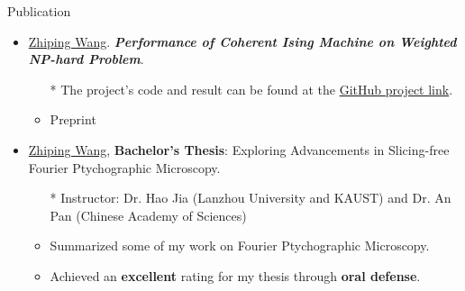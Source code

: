 \documentclass[]{kyvernitis-resume}
\begin{document}
\begin{section}{\Large Publication}
\begin{itemize}
    \item \underline{Zhiping Wang}. \emph{\textbf{Performance of Coherent Ising Machine on Weighted NP-hard Problem}}.
    \begin{itemize}
    \item[*] The project's code and result can be found at the \href{https://github.com/Wang-Zhiping/Exploring-the-Performance-of-Coherent-Ising-Machine-in-weighted-NP-Hard-Problems}{GitHub project link}.
    \item Preprint
    \end{itemize}




    \item \underline{Zhiping Wang}, \textbf{Bachelor’s Thesis}: Exploring Advancements in  Slicing-free Fourier Ptychographic Microscopy.
    \begin{itemize}
        \item[*] Instructor: Dr. Hao Jia (Lanzhou University and KAUST) and Dr. An Pan (Chinese Academy of Sciences)
        \item Summarized some of my work on Fourier Ptychographic Microscopy. 
        \item Achieved an \textbf{excellent} rating for my thesis through \textbf{oral defense}.
        \end{itemize}

\end{itemize}
\end{section}


\newpage
\end{document}
